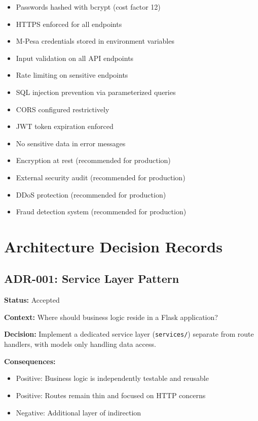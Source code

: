 \documentclass[12pt, a4paper, twoside, openright]{report}
\begin{document}
\begin{itemize}
    \item[$\boxtimes$] Passwords hashed with bcrypt (cost factor 12)
    \item[$\boxtimes$] HTTPS enforced for all endpoints
    \item[$\boxtimes$] M-Pesa credentials stored in environment variables
    \item[$\boxtimes$] Input validation on all API endpoints
    \item[$\boxtimes$] Rate limiting on sensitive endpoints
    \item[$\boxtimes$] SQL injection prevention via parameterized queries
    \item[$\boxtimes$] CORS configured restrictively
    \item[$\boxtimes$] JWT token expiration enforced
    \item[$\boxtimes$] No sensitive data in error messages
    \item[$\square$] Encryption at rest (recommended for production)
    \item[$\square$] External security audit (recommended for production)
    \item[$\square$] DDoS protection (recommended for production)
    \item[$\square$] Fraud detection system (recommended for production)
\end{itemize}

\chapter{Architecture Decision Records}

\section{ADR-001: Service Layer Pattern}

\textbf{Status:} Accepted

\textbf{Context:} Where should business logic reside in a Flask application?

\textbf{Decision:} Implement a dedicated service layer (\texttt{services/}) separate from route handlers, with models only handling data access.

\textbf{Consequences:}
\begin{itemize}
    \item Positive: Business logic is independently testable and reusable
    \item Positive: Routes remain thin and focused on HTTP concerns
    \item Negative: Additional layer of indirection
\end{itemize}
\end{document}
